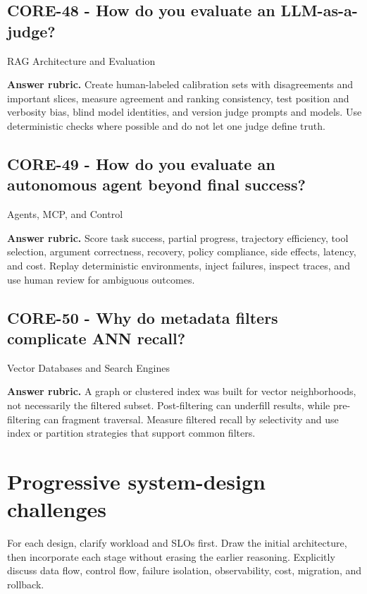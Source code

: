 \subsection*{CORE-48 - How do you evaluate an LLM-as-a-judge?}
 \quad RAG Architecture and Evaluation
\par\smallskip\textbf{Answer rubric.} Create human-labeled calibration sets with disagreements and important slices, measure agreement and ranking consistency, test position and verbosity bias, blind model identities, and version judge prompts and models. Use deterministic checks where possible and do not let one judge define truth.
\subsection*{CORE-49 - How do you evaluate an autonomous agent beyond final success?}
 \quad Agents, MCP, and Control
\par\smallskip\textbf{Answer rubric.} Score task success, partial progress, trajectory efficiency, tool selection, argument correctness, recovery, policy compliance, side effects, latency, and cost. Replay deterministic environments, inject failures, inspect traces, and use human review for ambiguous outcomes.
\subsection*{CORE-50 - Why do metadata filters complicate ANN recall?}
 \quad Vector Databases and Search Engines
\par\smallskip\textbf{Answer rubric.} A graph or clustered index was built for vector neighborhoods, not necessarily the filtered subset. Post-filtering can underfill results, while pre-filtering can fragment traversal. Measure filtered recall by selectivity and use index or partition strategies that support common filters.
\clearpage\section{Progressive system-design challenges}
For each design, clarify workload and SLOs first. Draw the initial architecture, then incorporate each stage without erasing the earlier reasoning. Explicitly discuss data flow, control flow, failure isolation, observability, cost, migration, and rollback.
